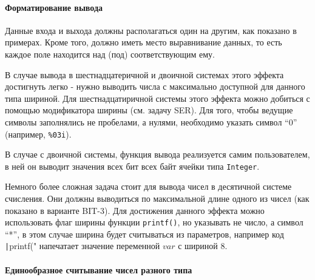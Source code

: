 \paragraph{Форматирование вывода}
Данные входа и выхода должны располагаться один на другим, как показано в примерах. Кроме того, должно иметь место выравнивание данных, то есть каждое поле находится над (под) соответствующим ему. 

В случае вывода в шестнадцатеричной и двоичной системах этого эффекта достигнуть легко - нужно выводить числа с максимально доступной для данного типа шириной. Для шестнадцатиричной системы этого эффекта можно добиться с помощью модификатора ширины (см. задачу SER). Для того, чтобы ведущие символы заполнялись не пробелами, а нулями, необходимо указать символ ``0'' (например, \verb|%03i|).

В случае с двоичной системы, функция вывода реализуется самим пользователем, в ней он выводит значения всех бит всех байт ячейки типа \texttt{Integer}.

Немного более сложная задача стоит для вывода чисел в десятичной системе счисления. Они должны выводиться по максимальной длине одного из чисел (как показано в варианте BIT-3). Для достижения данного эффекта можно использовать флаг ширины функции \texttt{printf()}, но указывать не число, а символ ``*'', в этом случае ширина будет считываться из параметров, например код \texttt|printf("%
напечатает значение переменной $var$ с шириной 8.
\begin{comment}
\begin{itemize}
    \item Здесь гораздо подробнее надо остановиться на \texttt{Integer}, как его нужно универсально использовать, пользуясь sizeof и прочими средствами. 
    
    \item Объяснить про считывание с клавиатуры, про тип MaxInt. Рассмотреть приведение типов, а то они не понимают ничерта в этом, тупят ужасно.
    \item Показать на наглядном примерчике с картинкой в памяти как выставить бит, например, или как выставить байт в числе. Как "склеить" числа.
    \item Кроме того, научить их выводить числа в правильном формате. Нужно ли объяснять про двоичную что-то?
\end{itemize}
\end{comment}
\paragraph{Единообразное считывание чисел разного типа}

